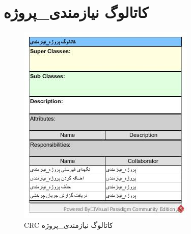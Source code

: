 \section{کاتالوگ نیازمندی\_پروژه}
\begin{figure}[H]
	\centering
	\includegraphics[scale=1]{img/crc/ProjectRequirementCatalogue}
	\caption{CRC کاتالوگ نیازمندی\_پروژه }
\end{figure}
